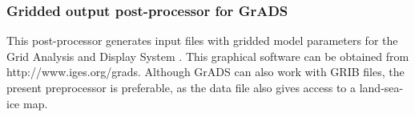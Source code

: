 \vsssub
\subsubsection{Gridded output post-processor for GrADS} \label{sec:gxoutf}
\vsssub



\vspace{\baselineskip} 
\noindent 
This post-processor generates input files with gridded model parameters for
the Grid Analysis and Display System \citep[GrADS,][]{man:GrADS}. This
graphical software can be obtained from http://www.iges.org/grads. Although
GrADS can also work with GRIB files, the present preprocessor is preferable,
as the data file also gives access to a land-sea-ice map.

\pb